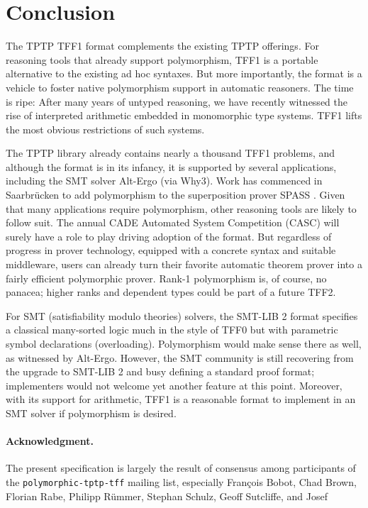 \section{Conclusion}
\label{sec_concl}

The TPTP TFF1 format complements the existing TPTP
offerings. %
For reasoning tools that already
support polymorphism, TFF1 is a portable alternative to the existing ad hoc
syntaxes. But more importantly, the format is a vehicle to foster native
polymorphism support in automatic reasoners.
The time is ripe: After many
years of untyped reasoning, we have recently witnessed the rise of
interpreted arithmetic embedded in monomorphic type systems. TFF1
lifts the most obvious restrictions of such systems.

The TPTP library already contains
nearly a thousand TFF1 problems, and although the format is in its
infancy, it is supported by several applications, including the SMT solver
Alt-Ergo (via Why3).
Work has commenced in Saarbr\"ucken to add polymorphism to the
superposition prover SPASS \cite{wand-weidenbach-2012}.
Given that many applications require polymorphism, other reasoning tools are
likely to follow suit.
The annual CADE Automated System Competition (CASC) will surely have a role
to play driving adoption of the format.
But regardless of progress in
prover technology, equipped with a concrete syntax and suitable middleware,
users can already turn their favorite automatic theorem prover into a
fairly efficient polymorphic prover.
Rank-1 polymorphism is, of course, no panacea; higher ranks and dependent types
could be part of a future TFF2.

For SMT (satisfiability modulo theories) solvers, the SMT-LIB 2 format \cite{barrett-et-al-2010} specifies a
classical many-sorted logic %
much in the style of TFF0 but with parametric symbol declarations (overloading).
Polymorphism would make sense there as well, as witnessed by Alt-Ergo.
However, the SMT community is still recovering from the %
upgrade to SMT-LIB 2 and busy defining a standard proof format;
implementers would %
not welcome yet another
feature at this point. Moreover, with its support for arithmetic, TFF1 is a
reasonable format to implement in an SMT solver if polymorphism is desired.

\def\ackname{Acknowledgment}
\paragraph{\textbf{\upshape\ackname.}}
%
The present specification is largely the result of consensus among
participants of the {\tt polymorphic-tptp-tff} mailing list,
especially Fran\c{c}ois Bobot, Chad Brown, Florian Rabe, Philipp R\"ummer,
Stephan Schulz, Geoff Sutcliffe, and Josef

